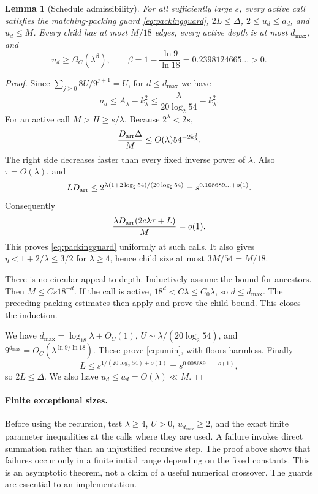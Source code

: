 \documentclass[11pt]{article}
\newtheorem{lemma}[theorem]{Lemma}
\theoremstyle{remark}\newtheorem{remark}[theorem]{Remark}
\newcommand{\Darr}{D_{\rm arr}}
\begin{document}
\begin{lemma}[Schedule admissibility]\label{lem:admissibility}
For all sufficiently large \(s\), every active call satisfies the matching-packing guard \eqref{eq:packingguard}, \(2L\le\Delta\), \(2\le u_d\le a_d\), and \(u_d\le M\). Every child has at most \(M/18\) edges, every active depth is at most \(d_{\max}\), and
\begin{equation}
 u_d\ge\Omega_C(\lambda^\beta),\qquad
 \beta=1-\frac{\ln9}{\ln18}=0.2398124665\ldots>0.
 \label{eq:umin}
\end{equation}
\end{lemma}
\begin{proof}
Since \(\sum_{j\ge0}8U/9^{j+1}=U\), for \(d\le d_{\max}\) we have
\begin{equation}
 a_d\le A_\lambda-k_\lambda^2
 \le\frac{\lambda}{20\log_2 54}-k_\lambda^2.
 \label{eq:amax}
\end{equation}
For an active call \(M>H\ge s/\lambda\). Because \(2^\lambda<2s\),
\begin{equation}
 \frac{\Darr\Delta}{M}
 \le O(\lambda)54^{-2k_\lambda^2}.
 \label{eq:packingdecay}
\end{equation}
The right side decreases faster than every fixed inverse power of \(\lambda\). Also \(\tau=O(\lambda)\), and
\[
 L\Darr\le
 2^{\lambda(1+2\log_2 54)/(20\log_2 54)}
 =s^{0.108689\ldots+o(1)}.
\]
Consequently
\[
 \frac{\lambda\Darr(2c\lambda\tau+L)}M=o(1).
\]
This proves \eqref{eq:packingguard} uniformly at such calls. It also gives \(\eta<1+2/\lambda\le3/2\) for \(\lambda\ge4\), hence child size at most \(3M/54=M/18\).

There is no circular appeal to depth. Inductively assume the bound for ancestors. Then \(M\le Cs18^{-d}\). If the call is active, \(18^d<C\lambda\le C_0\lambda\), so \(d\le d_{\max}\). The preceding packing estimates then apply and prove the child bound. This closes the induction.

We have \(d_{\max}=\log_{18}\lambda+O_C(1)\),
\(U\sim\lambda/(20\log_2 54)\), and
\(9^{d_{\max}}=O_C(\lambda^{\ln9/\ln18})\). These prove \eqref{eq:umin}, with floors harmless. Finally
\[
 L\le s^{1/(20\log_2 54)+o(1)}=s^{0.008689\ldots+o(1)},
\]
so \(2L\le\Delta\). We also have \(u_d\le a_d=O(\lambda)\ll M\).
\end{proof}

\paragraph{Finite exceptional sizes.}
Before using the recursion, test \(\lambda\ge4\), \(U>0\), \(u_{d_{\max}}\ge2\), and the exact finite parameter inequalities at the calls where they are used. A failure invokes direct summation rather than an unjustified recursive step. The proof above shows that failures occur only in a finite initial range depending on the fixed constants. This is an asymptotic theorem, not a claim of a useful numerical crossover. The guards are essential to an implementation.
\end{document}
